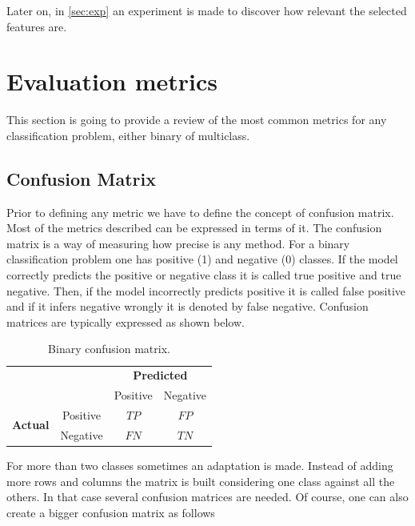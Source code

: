\noindent Later on, in \autoref{sec:exp} an experiment is made to discover how relevant the selected features are.

\section{Evaluation metrics}\label{sec:metrics}

This section is going to provide a review of the most common metrics for any classification problem, either binary of multiclass. 

\subsection{Confusion Matrix}

Prior to defining any metric we have to define the concept of confusion matrix. Most of the metrics described can be expressed in terms of it. The confusion matrix is a way of measuring how precise is any method. For a binary classification problem one has positive (1) and negative (0) classes. If the model correctly predicts the positive or negative class it is called true positive and true negative. Then, if the model incorrectly predicts positive it is called false positive and if it infers negative wrongly it is denoted by false negative. Confusion matrices are typically expressed as shown below.

\begin{table}[ht]
\centering
\caption{Binary confusion matrix.}
\begin{tabular}{c c c|c|}
& & \multicolumn{2}{c}{\textbf{Predicted}} \\ \cline{3-4}
& & \multicolumn{1}{|c|}{Positive} & Negative \\ \cline{2-4}
\multirow{2}{*}{\textbf{Actual}} & \multicolumn{1}{|c|}{Positive} & $TP$ & $FP$ \\ \cline{2-4}
                     & \multicolumn{1}{|c|}{Negative} & $FN$ & $TN$ \\ \cline{2-4}
\end{tabular}
\label{table:confusion_matrix}
\end{table}

For more than two classes sometimes an adaptation is made. Instead of adding more rows and columns the matrix is built considering one class against all the others. In that case several confusion matrices are needed. Of course, one can also create a bigger confusion matrix as follows

